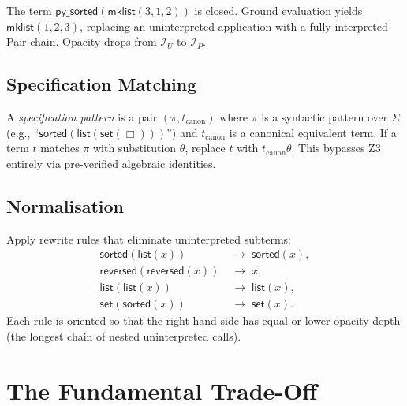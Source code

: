 \begin{example}
The term $\mathsf{py\_sorted}(\mathsf{mklist}(3, 1, 2))$ is closed.
Ground evaluation yields $\mathsf{mklist}(1, 2, 3)$, replacing
an uninterpreted application with a fully interpreted Pair-chain.
Opacity drops from $\mathcal{I}_U$ to $\mathcal{I}_P$.
\end{example}

\subsection{Specification Matching}

\begin{definition}
\label{def:spec-match}
A \emph{specification pattern} is a pair $(\pi, t_{\mathrm{canon}})$
where $\pi$ is a syntactic pattern over $\Sigma$ (e.g.,
``$\mathsf{sorted}(\mathsf{list}(\mathsf{set}(\Box)))$'') and
$t_{\mathrm{canon}}$ is a canonical equivalent term.  If a term $t$
matches $\pi$ with substitution $\theta$, replace $t$ with
$t_{\mathrm{canon}}\theta$.  This bypasses Z3 entirely via
pre-verified algebraic identities.
\end{definition}

\subsection{Normalisation}

\begin{definition}
\label{def:normalise}
Apply rewrite rules that eliminate uninterpreted subterms:
\begin{align}
  \mathsf{sorted}(\mathsf{list}(x)) &\;\longrightarrow\;
    \mathsf{sorted}(x), \\
  \mathsf{reversed}(\mathsf{reversed}(x)) &\;\longrightarrow\; x, \\
  \mathsf{list}(\mathsf{list}(x)) &\;\longrightarrow\;
    \mathsf{list}(x), \\
  \mathsf{set}(\mathsf{sorted}(x)) &\;\longrightarrow\;
    \mathsf{set}(x).
\end{align}
Each rule is oriented so that the right-hand side has equal or
lower opacity depth (the longest chain of nested uninterpreted
calls).
\end{definition}


\section{The Fundamental Trade-Off}
\label{sec:tradeoff}

